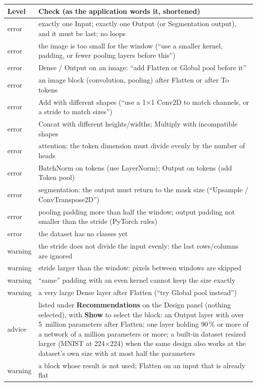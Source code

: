 \documentclass[11pt,a4paper]{article}
\newcommand{\ui}[1]{\textbf{\textsf{#1}}}
\begin{document}
\begin{longtable}{@{}p{1.6cm}p{13.4cm}@{}}
\toprule
\textbf{Level} & \textbf{Check (as the application words it, shortened)}\\
\midrule\endhead
error & exactly one Input; exactly one Output (or Segmentation output), and it must be last; no loops\\
error & the image is too small for the window (``use a smaller kernel, padding, or fewer pooling layers before this'')\\
error & Dense / Output on an image: ``add Flatten or Global pool before it''\\
error & an image block (convolution, pooling) after Flatten or after To tokens\\
error & Add with different shapes (``use a 1$\times$1 Conv2D to match channels, or a stride to match sizes'')\\
error & Concat with different heights/widths; Multiply with incompatible shapes\\
error & attention: the token dimension must divide evenly by the number of heads\\
error & BatchNorm on tokens (use LayerNorm); Output on tokens (add Token pool)\\
error & segmentation: the output must return to the mask size (``Upsample / ConvTranspose2D'')\\
error & pooling padding more than half the window; output padding not smaller than the stride (PyTorch rules)\\
error & the dataset has no classes yet\\
warning & the stride does not divide the input evenly: the last rows/columns are ignored\\
warning & stride larger than the window: pixels between windows are skipped\\
warning & ``same'' padding with an even kernel cannot keep the size exactly\\
warning & a very large Dense layer after Flatten (``try Global pool instead'')\\
advice & listed under \ui{Recommendations} on the Design panel (nothing selected), with \ui{Show} to select the block: an Output layer with over 5~million parameters after Flatten; one layer holding 90\,\% or more of a network of a million parameters or more; a built-in dataset resized larger (MNIST at 224$\times$224) when the same design also works at the dataset's own size with at most half the parameters\\
warning & a block whose result is not used; Flatten on an input that is already flat\\
\bottomrule
\end{longtable}
\end{document}
